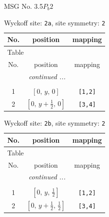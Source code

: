 \documentclass[fleqn,8pt]{jsarticle}
\begin{document}
\setcounter{MaxMatrixCols}{32}

\renewcommand{\tablename}{Table~}
\renewcommand{\figurename}{Figure~}
\begin{center}
\LARGE
MSG No. 3.5\quad$P_{b}2$
\end{center}
\renewcommand{\arraystretch}{1.2}
\begin{longtable}{ccc}
\caption{Wyckoff site: {\tt 2a}, site symmetry: {\tt 2}}
 \\
 \hline \hline
No. & position & mapping \\ \hline \endfirsthead

\multicolumn{2}{l}{\tablename\ \thetable{}} \\
 \hline \hline
No. & position & mapping \\ \hline \endhead

 \hline \hline
\multicolumn{2}{r}{\footnotesize\it continued ...} \\ \endfoot

 \hline \hline
\multicolumn{2}{r}{} \\ \endlastfoot

1 & $\left[ 0,\, y,\, 0 \right]$ & {\tt [1,2]} \\ \hline
2 & $\left[ 0,\, y + \frac{1}{2},\, 0 \right]$ & {\tt [3,4]} \\
\end{longtable}
\renewcommand{\arraystretch}{1.2}
\begin{longtable}{ccc}
\caption{Wyckoff site: {\tt 2b}, site symmetry: {\tt 2}}
 \\
 \hline \hline
No. & position & mapping \\ \hline \endfirsthead

\multicolumn{2}{l}{\tablename\ \thetable{}} \\
 \hline \hline
No. & position & mapping \\ \hline \endhead

 \hline \hline
\multicolumn{2}{r}{\footnotesize\it continued ...} \\ \endfoot

 \hline \hline
\multicolumn{2}{r}{} \\ \endlastfoot

1 & $\left[ 0,\, y,\, \frac{1}{2} \right]$ & {\tt [1,2]} \\ \hline
2 & $\left[ 0,\, y + \frac{1}{2},\, \frac{1}{2} \right]$ & {\tt [3,4]} \\
\end{longtable}
\renewcommand{\arraystretch}{1.2}
\end{document}
